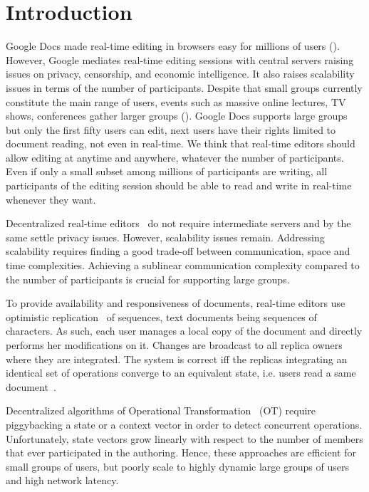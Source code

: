 
\section{Introduction}

Google Docs made real-time editing in browsers easy for millions of users
(\REF). However, Google mediates real-time editing sessions with central servers
raising issues on privacy, censorship, and economic intelligence. It also raises
scalability issues in terms of the number of participants.  Despite that small
groups currently constitute the main range of users, events such as massive
online lectures, TV shows, conferences gather larger groups (\REF).  Google Docs
supports large groups but only the first fifty users can edit, next users have
their rights limited to document reading, not even in real-time.  We think that
real-time editors should allow editing at anytime and anywhere, whatever the
number of participants. Even if only a small subset among millions of
participants are writing, all participants of the editing session should be able
to read and write in real-time whenever they want.

Decentralized real-time editors~\cite{oster2006data, sun1998operational,
  sun2009contextbased} do not require intermediate servers and by the same
settle privacy issues. However, scalability issues remain.  Addressing
scalability requires finding a good trade-off between communication, space and
time complexities. Achieving a sublinear communication complexity compared to
the number of participants is crucial for supporting large groups.

To provide availability and responsiveness of documents, real-time editors use
optimistic replication~\cite{saito2005optimistic} of sequences, text documents
being sequences of characters. As such, each user manages a local copy of the
document and directly performs her modifications on it. Changes are broadcast to
all replica owners where they are integrated. The system is correct iff the
replicas integrating an identical set of operations converge to an equivalent
state, i.e. users read a same document~\cite{shapiro2011conflict}.

Decentralized algorithms of Operational
Transformation~\cite{sun2009contextbased} (OT) require piggybacking a state or a
context vector in order to detect concurrent operations. Unfortunately, state
vectors grow linearly with respect to the number of members that ever
participated in the authoring. Hence, these approaches are efficient for small
groups of users, but poorly scale to highly dynamic large groups of users and
high network latency.

